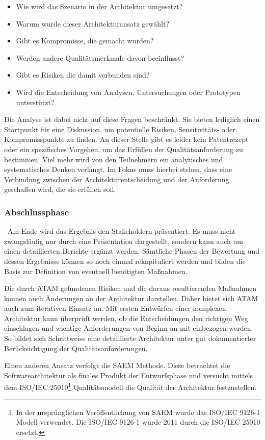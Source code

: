 \begin{itemize}
	\item Wie wird das Szenario in der Architektur umgesetzt?
	\item Warum wurde dieser Architekturansatz gewählt?
	\item Gibt es Kompromisse, die gemacht wurden?
	\item Werden andere Qualitätsmerkmale davon beeinflusst?
	\item Gibt es Risiken die damit verbunden sind?
	\item Wird die Entscheidung von Analysen, Untersuchungen oder Prototypen unterstützt?
\end{itemize}

Die Analyse ist dabei nicht auf diese Fragen beschränkt. Sie bieten lediglich einen Startpunkt für eine Diskussion, um potentielle Risiken, Sensitivitäts- oder Kompromisspunkte zu finden. An dieser Stelle gibt es leider kein Patentrezept oder ein spezifisches Vorgehen, um das Erfüllen der Qualitätsanforderung zu bestimmen. Viel mehr wird von den Teilnehmern ein analytisches und systematisches Denken verlangt. Im Fokus muss hierbei stehen, dass eine Verbindung zwischen der Architekturentscheidung und der Anforderung geschaffen wird, die sie erfüllen soll.

\subsubsection{Abschlussphase}
\
Am Ende wird das Ergebnis den Stakeholdern präsentiert. Es muss nicht zwangsläufig nur durch eine Präsentation dargestellt, sondern kann auch um einen detaillierten Berichte ergänzt werden. Sämtliche Phasen der Bewertung und dessen Ergebnisse können so noch einmal rekapituliert werden und bilden die Basis zur Definition von eventuell benötigten Maßnahmen.

Die durch \ac{ATAM} gefundenen Risiken und die daraus resultierenden Maßnahmen können auch Änderungen an der Architektur darstellen. Daher bietet sich \ac{ATAM} auch zum iterativen Einsatz an. Mit ersten Entwürfen einer komplexen Architektur kann überprüft werden, ob die Entscheidungen den richtigen Weg einschlagen und wichtige Anforderungen von Beginn an mit einbezogen werden. So bildet sich Schrittweise eine detaillierte Architektur unter gut dokumentierter Berücksichtigung der Qualitätsanforderungen. 

Einen anderen Ansatz verfolgt die \ac{SAEM} Methode. Diese betrachtet die Softwarearchitektur als finales Produkt der Entwurfsphase und versucht mittels dem ISO/IEC 25010\footnote{
	In der ursprünglichen Veröffentlichung von \ac{SAEM} wurde das ISO/IEC 9126-1 Modell verwendet. Die ISO/IEC 9126-1 wurde 2011 durch die ISO/IEC 25010 ersetzt.
}
Qualitätsmodell die Qualität der Architektur festzustellen.


